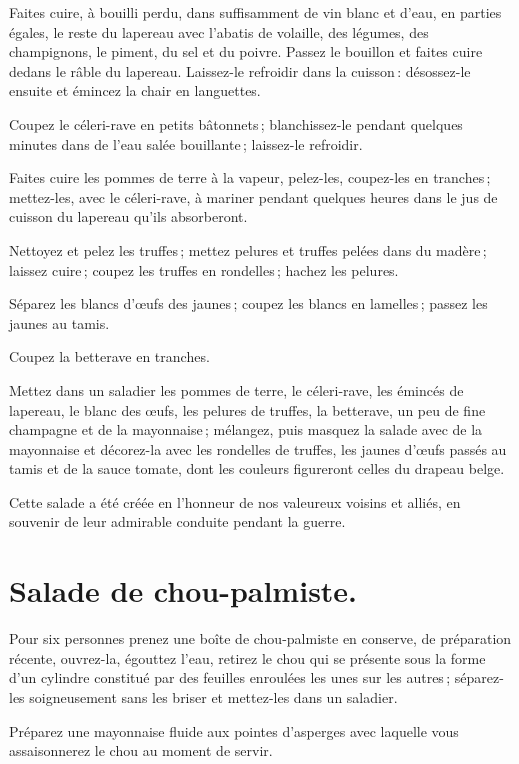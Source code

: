Faites cuire, à bouilli perdu, dans suffisamment de vin blanc et d'eau, en
parties égales, le reste du lapereau avec l'abatis de volaille, des légumes,
des champignons, le piment, du sel et du poivre. Passez le bouillon et faites
cuire dedans le râble du lapereau. Laissez-le refroidir dans la cuisson :
désossez-le ensuite et émincez la chair en languettes.

Coupez le céleri-rave en petits bâtonnets ; blanchissez-le pendant quelques
minutes dans de l’eau salée bouillante ; laissez-le refroidir.

Faites cuire les pommes de terre à la vapeur, pelez-les, coupez-les en tranches ;
mettez-les, avec le céleri-rave, à mariner pendant quelques heures dans le jus de
cuisson du lapereau qu'ils absorberont.

Nettoyez et pelez les truffes ; mettez pelures et truffes pelées dans du
madère ; laissez cuire ; coupez les truffes en rondelles ; hachez les pelures.

Séparez les blancs d'œufs des jaunes ; coupez les blancs en lamelles ; passez
les jaunes au tamis.

Coupez la betterave en tranches.

Mettez dans un saladier les pommes de terre, le céleri-rave, les émincés de
lapereau, le blanc des œufs, les pelures de truffes, la betterave, un peu de
fine champagne et de la mayonnaise ; mélangez, puis masquez la salade avec de
la mayonnaise et décorez-la avec les rondelles de truffes, les jaunes d'œufs
passés au tamis et de la sauce tomate, dont les couleurs figureront celles du
drapeau belge.

Cette salade a été créée en l'honneur de nos valeureux voisins et alliés, en
souvenir de leur admirable conduite pendant la guerre.

\section*{\centering Salade de chou-palmiste.}
{}

Pour six personnes prenez une boîte de chou-palmiste en conserve, de
préparation récente, ouvrez-la, égouttez l'eau, retirez le chou qui se présente
sous la forme d’un cylindre constitué par des feuilles enroulées les unes sur
les autres ; séparez-les soigneusement sans les briser et mettez-les dans un
saladier.

Préparez une mayonnaise fluide aux pointes d'asperges avec laquelle vous
assaisonnerez le chou au moment de servir.


